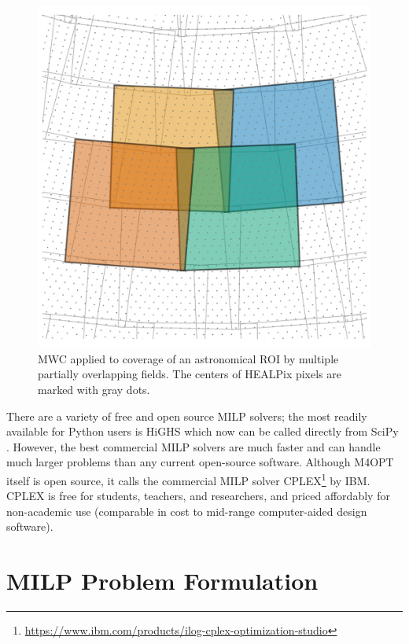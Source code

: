 \documentclass[twocolumn,times]{aastex631}
\begin{document}
\begin{figure}
    \includegraphics[width=\columnwidth]{figures/overlapping-fields}
    \caption{\label{fig:overlapping-fields}\ac{MWC} applied to coverage of an astronomical \ac{ROI} by multiple partially overlapping fields. The centers of \ac{HEALPix} pixels are marked with gray dots.}
\end{figure}

There are a variety of free and open source \ac{MILP} solvers; the most readily available for Python users is HiGHS \citep{huangfu2018parallelizing} which now can be called directly from SciPy \citep{2020NatMe..17..261V}. However, the best commercial \ac{MILP} solvers are much faster and can handle much larger problems than any current open-source software. Although \ac{M4OPT} itself is open source, it calls the commercial \ac{MILP} solver CPLEX\footnote{\url{https://www.ibm.com/products/ilog-cplex-optimization-studio}} by IBM. CPLEX is free for students, teachers, and researchers, and priced affordably for non-academic use (comparable in cost to mid-range computer-aided design software).

\section{MILP Problem Formulation}
\end{document}
